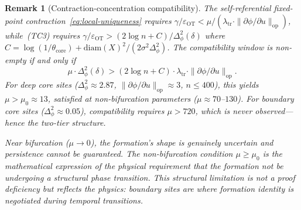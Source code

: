 \documentclass[lettersize,journal]{IEEEtran}
\newtheorem{remark}{Remark}
\begin{document}
\begin{remark}[Contraction-concentration compatibility]
\label{rmk:compatibility}
The self-referential fixed-point contraction~\eqref{eq:local-uniqueness} requires $\gamma/\varepsilon_{\mathrm{OT}} < \mu/(\lambda_{\mathrm{tr}} \cdot \|\partial\phi/\partial u\|_{\mathrm{op}})$, while~(TC3) requires $\gamma/\varepsilon_{\mathrm{OT}} > (2\log n + C)/\Delta_\phi^2(\delta)$ where $C = \log(1/\theta_{\mathrm{core}}) + \mathrm{diam}(X)^2/(2\sigma^2\Delta_\phi^2)$. The compatibility window is non-empty if and only if
\begin{equation}
\label{eq:compatibility}
\mu \cdot \Delta_\phi^2(\delta) > (2\log n + C) \cdot \lambda_{\mathrm{tr}} \cdot \|\partial\phi/\partial u\|_{\mathrm{op}}.
\end{equation}
For deep core sites ($\Delta_\phi^2 \approx 2.87$, $\|\partial\phi/\partial u\|_{\mathrm{op}} \approx 3$, $n \leq 400$), this yields $\mu > \mu_0 \approx 13$, satisfied at non-bifurcation parameters ($\mu \approx 70$--$130$). For boundary core sites ($\Delta_\phi^2 \approx 0.05$), compatibility requires $\mu > 720$, which is never observed---hence the two-tier structure.

Near bifurcation ($\mu \to 0$), the formation's shape is genuinely uncertain and persistence cannot be guaranteed. The non-bifurcation condition $\mu \geq \mu_0$ is the mathematical expression of the physical requirement that the formation not be undergoing a structural phase transition. This structural limitation is not a proof deficiency but reflects the physics: boundary sites are where formation identity is negotiated during temporal transitions.
\end{remark}
\end{document}
